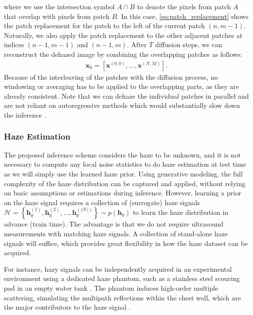 \documentclass[journal,twoside,web]{ieeecolor}
\newcommand{\bx}{{\mathbf x}}
\newcommand{\bh}{{\mathbf h}}
\begin{document}
where we use the intersection symbol $A\cap B$ to denote the pixels from patch $A$ that overlap with pixels from patch $B$. In this case, \eqref{eq:patch_replacement} shows the patch replacement for the patch to the left of the current patch $(n, m-1)$. Naturally, we also apply the patch replacement to the other adjacent patches at indices $(n-1, m-1)$ and $ (n-1, m)$. After $T$ diffusion steps, we can reconstruct the dehazed image by combining the overlapping patches as follows:
\begin{align}
    \bx_0 = [ \bx^{(0, 0)}, \dots, \bx^{(N, M)} ].
\end{align}
Because of the interleaving of the patches with the diffusion process, no windowing or averaging has to be applied to the overlapping parts, as they are already consistent. Note that we can dehaze the individual patches in parallel and are not reliant on autoregressive methods which would substantially slow down the inference \cite{sahariaPaletteImagetoImageDiffusion2022}.

\subsubsection{Haze Estimation}
\label{sec:haze_estimation}
The proposed inference scheme considers the haze to be unknown, and it is not necessary to compute any local noise statistics to do haze estimation at test time as we will simply use the learned haze prior. Using generative modeling, the full complexity of the haze distribution can be captured and applied, without relying on basic assumptions or estimations during inference. However, learning a prior on the haze signal requires a collection of (surrogate) haze signals $\mathcal{H} = \left\{\bh_0^{(1)}, \bh_0^{(2)}, \ldots,  \bh_0^{(|\mathcal{H}|)}\right\}\sim p(\bh_0)$ to learn the haze distribution in advance (train time). The advantage is that we do not require ultrasound measurements with matching haze signals. A collection of stand-alone haze signals will suffice, which provides great flexibility in how the haze dataset can be acquired. 

For instance, hazy signals can be independently acquired in an experimental environment using a dedicated haze phantom, such as a stainless steel scouring pad in an empty water tank \cite{vignonRevisitingWienerPostfilter2020}. The phantom induces high-order multiple scattering, simulating the multipath reflections within the chest wall, which are the major contributors to the haze signal \cite{fatemiStudyingOriginReverberation2019}.
\end{document}
